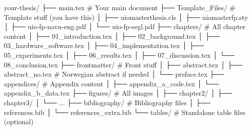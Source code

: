 your-thesis/
├── main.tex                    # Your main document
├── Template_Files/             # Template stuff (you have this)
│   ├── uiomasterthesis.cls
│   ├── uiomasterfp.sty
│   ├── uio-fp-navn-eng.pdf
│   └── uio-fp-segl.pdf
├── chapters/                   # All chapter content
│   ├── 01_introduction.tex
│   ├── 02_background.tex
│   ├── 03_hardware_software.tex
│   ├── 04_implementation.tex
│   ├── 05_experiments.tex
│   ├── 06_results.tex
│   ├── 07_discussion.tex
│   └── 08_conclusion.tex
├── frontmatter/               # Front stuff
│   ├── abstract.tex
│   ├── abstract_no.tex        # Norwegian abstract if needed
│   └── preface.tex
├── appendices/                # Appendix content
│   ├── appendix_a_code.tex
│   └── appendix_b_data.tex
├── figures/                   # All images
│   ├── chapter2/
│   ├── chapter3/
│   └── ...
├── bibliography/              # Bibliography files
│   ├── references.bib
│   └── references_extra.bib
└── tables/                    # Standalone table files (optional)
